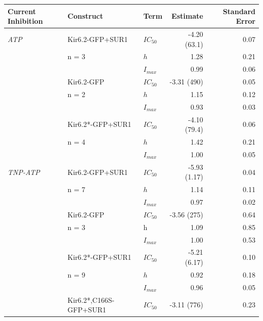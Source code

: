 \documentclass[10pt,lineno, doublespacing]{elife}
\begin{document}
\begin{table}
\centering\begingroup
\begin{tabular}{p{32mm} l l r r}
\toprule
\textbf{Current Inhibition} & Construct & Term & Estimate & Standard Error\\
\midrule
\textit{ATP} & Kir6.2-GFP+SUR1            & $IC_{50}$ & -4.20 (63.1) & 0.07\\
             & n = 3                      & $h$       & 1.28         & 0.21\\
             &                            & $I_{max}$ & 0.99         & 0.06\\
\cmidrule{2-5}
             & Kir6.2-GFP                 & $IC_{50}$ & -3.31 (490)  & 0.05\\
             & n = 2                      & $h$       & 1.15         & 0.12\\
             &                            & $I_{max}$ & 0.93         & 0.03\\
\cmidrule{2-5}
             & Kir6.2*-GFP+SUR1           & $IC_{50}$ & -4.10 (79.4) & 0.06\\
             & n = 4                      & $h$       & 1.42         & 0.21\\
             &                            & $I_{max}$ & 1.00         & 0.05\\
\cmidrule{2-5}
\textit{TNP-ATP} & Kir6.2-GFP+SUR1        & $IC_{50}$ & -5.93 (1.17) & 0.04\\
                 & n = 7                  & $h$       & 1.14         & 0.11\\
                 &                        & $I_{max}$ & 0.97         & 0.02\\
\cmidrule{2-5}
                 & Kir6.2-GFP             & $IC_{50}$ & -3.56 (275)  & 0.64\\
                 & n = 3                  & h         & 1.09         & 0.85\\
                 &                        & $I_{max}$ & 1.00         & 0.53\\
\cmidrule{2-5}
                 & Kir6.2*-GFP+SUR1       & $IC_{50}$ & -5.21 (6.17) & 0.10\\
                 & n = 9                  & $h$       & 0.92         & 0.18\\
                 &                        & $I_{max}$ & 0.96         & 0.05\\
\cmidrule{2-5}
                 & Kir6.2*,C166S-GFP+SUR1 & $IC_{50}$ & -3.11 (776)  & 0.23\\

\end{tabular}
\end{table}
\end{document}
